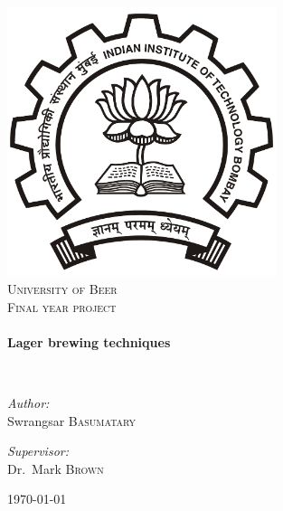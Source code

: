 \begin{titlepage}
\begin{center}

\includegraphics[width=0.59\textwidth]{iitbLogo}~\\[1cm]

\textsc{\LARGE University of Beer}\\[1.5cm]

\textsc{\Large Final year project}\\[0.5cm]

\HRule \\[0.4cm]
{ \huge \bfseries Lager brewing techniques \\[0.4cm] }

\HRule \\[1.5cm]

\begin{minipage}{0.4\textwidth}
\begin{flushleft} \large
\emph{Author:}\\
Swrangsar \textsc{Basumatary}
\end{flushleft}
\end{minipage}
\begin{minipage}{0.4\textwidth}
\begin{flushright} \large
\emph{Supervisor:} \\
Dr.~Mark \textsc{Brown}
\end{flushright}
\end{minipage}

\vfill

{\large \today}

\end{center}
\end{titlepage}